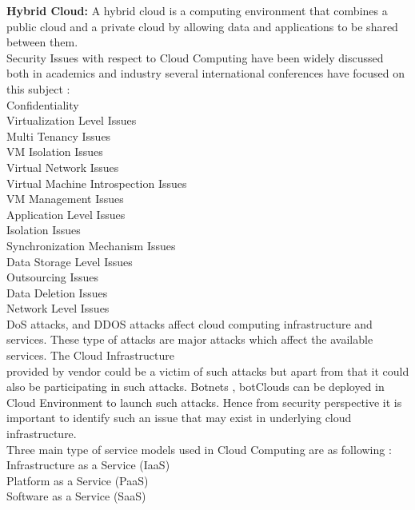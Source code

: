 \textbf{Hybrid Cloud:} A hybrid cloud is a computing environment that combines a public cloud and a private cloud by allowing data and applications to be shared between them.\\
Security Issues with respect to Cloud Computing \cite{fernandes2014security} have been widely discussed both in academics and industry several international conferences have focused on this subject :\\
Confidentiality\\
Virtualization Level Issues\\
Multi Tenancy Issues\\
VM Isolation Issues\\
Virtual Network Issues\\
Virtual Machine Introspection Issues\\
VM Management Issues\\
Application Level Issues\\
Isolation Issues\\
Synchronization Mechanism Issues\\
Data Storage Level Issues\\
Outsourcing Issues\\
Data Deletion Issues\\
Network Level Issues \\
\newline
DoS attacks, and DDOS attacks affect cloud computing infrastructure and services. These type of attacks are major attacks which affect the available services. The Cloud Infrastructure \\provided by vendor could be a victim of such attacks but apart from that it could also be participating in such attacks. Botnets , botClouds can be deployed in Cloud Environment \cite{de2019cyber} to launch such attacks. Hence from security perspective it is important to identify such an issue that may exist in underlying cloud infrastructure.\\
Three main type of service models used in Cloud Computing are as following :\\
Infrastructure as a Service (IaaS)\\
Platform as a Service (PaaS)\\
Software as a Service (SaaS)\\
